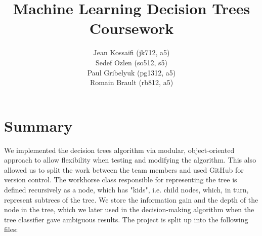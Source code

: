 \documentclass[11pt]{amsart}
\title{Machine Learning Decision Trees Coursework}
\author{Jean Kossaifi (jk712, a5) \\Sedef Ozlen (so512, s5) \\Paul Gribelyuk (pg1312, a5) \\Romain Brault (rb812, a5)}
\begin{document}
\maketitle
\section{Summary}
We implemented the decision trees algorithm via modular, object-oriented approach to allow flexibility when testing and modifying the algorithm.  This also allowed us to split the work between the team members and used GitHub for version control.  
The workhorse class responsible for representing the tree is defined recursively as a node, which has "kids", i.e. child nodes, which, in turn, represent subtrees of the tree.  We store the information gain and the depth of the node in the tree, which we later used in the decision-making algorithm when the tree classifier gave ambiguous results.  The project is split up into the following files:
\end{document}
